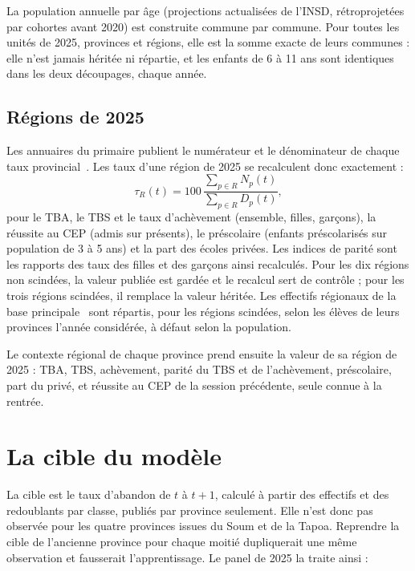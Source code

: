 \documentclass{article}
\begin{document}
La population annuelle par âge (projections actualisées de l'INSD, rétroprojetées par cohortes avant 2020) est construite commune par commune. Pour toutes les unités de 2025, provinces et régions, elle est la somme exacte de leurs communes : elle n'est jamais héritée ni répartie, et les enfants de 6 à 11 ans sont identiques dans les deux découpages, chaque année.

\subsection{Régions de 2025}
\label{sec:regions}

Les annuaires du primaire publient le numérateur et le dénominateur de chaque taux provincial~\cite{dgess_annuaires}. Les taux d'une région de 2025 se recalculent donc exactement :
\begin{equation}
\tau_R(t) = 100\,\frac{\sum_{p \in R} N_p(t)}{\sum_{p \in R} D_p(t)},
\end{equation}
pour le TBA, le TBS et le taux d'achèvement (ensemble, filles, garçons), la réussite au CEP (admis sur présents), le préscolaire (enfants préscolarisés sur population de 3 à 5 ans) et la part des écoles privées. Les indices de parité sont les rapports des taux des filles et des garçons ainsi recalculés. Pour les dix régions non scindées, la valeur publiée est gardée et le recalcul sert de contrôle ; pour les trois régions scindées, il remplace la valeur héritée. Les effectifs régionaux de la base principale~\cite{dgess_base} sont répartis, pour les régions scindées, selon les élèves de leurs provinces l'année considérée, à défaut selon la population.

Le contexte régional de chaque province prend ensuite la valeur de sa région de 2025 : TBA, TBS, achèvement, parité du TBS et de l'achèvement, préscolaire, part du privé, et réussite au CEP de la session précédente, seule connue à la rentrée.

\section{La cible du modèle}
\label{sec:cible}

La cible est le taux d'abandon de $t$ à $t+1$, calculé à partir des effectifs et des redoublants par classe, publiés par province seulement. Elle n'est donc pas observée pour les quatre provinces issues du Soum et de la Tapoa. Reprendre la cible de l'ancienne province pour chaque moitié dupliquerait une même observation et fausserait l'apprentissage. Le panel de 2025 la traite ainsi :
\end{document}

